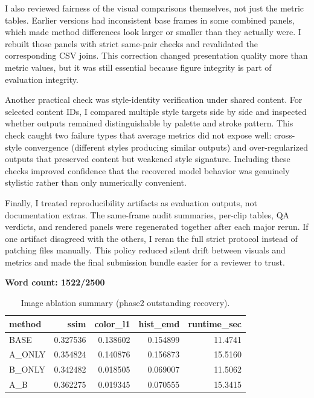 \documentclass[12pt,letterpaper]{article}
\begin{document}
I also reviewed fairness of the visual comparisons themselves, not just the metric tables. Earlier versions had inconsistent base frames in some combined panels, which made method differences look larger or smaller than they actually were. I rebuilt those panels with strict same-pair checks and revalidated the corresponding CSV joins. This correction changed presentation quality more than metric values, but it was still essential because figure integrity is part of evaluation integrity.

Another practical check was style-identity verification under shared content. For selected content IDs, I compared multiple style targets side by side and inspected whether outputs remained distinguishable by palette and stroke pattern. This check caught two failure types that average metrics did not expose well: cross-style convergence (different styles producing similar outputs) and over-regularized outputs that preserved content but weakened style signature. Including these checks improved confidence that the recovered model behavior was genuinely stylistic rather than only numerically convenient.

Finally, I treated reproducibility artifacts as evaluation outputs, not documentation extras. The same-frame audit summaries, per-clip tables, QA verdicts, and rendered panels were regenerated together after each major rerun. If one artifact disagreed with the others, I reran the full strict protocol instead of patching files manually. This policy reduced silent drift between visuals and metrics and made the final submission bundle easier for a reviewer to trust.

\textbf{Word count: 1522/2500}


\begin{table}[htbp]
\centering
\footnotesize
\setlength{\tabcolsep}{4pt}

\begin{tabular}{lrrrr}
\toprule
method & ssim & color\_l1 & hist\_emd & runtime\_sec \\
\midrule
BASE & 0.327536 & 0.138602 & 0.154899 & 11.4741 \\
A\_ONLY & 0.354824 & 0.140876 & 0.156873 & 15.5160 \\
B\_ONLY & 0.342482 & 0.018505 & 0.069007 & 11.5062 \\
A\_B & 0.362275 & 0.019345 & 0.070555 & 15.3415 \\
\bottomrule
\end{tabular}

\caption{Image ablation summary (phase2 outstanding recovery).}
\label{tab:image-ablation}
\end{table}
\end{document}
